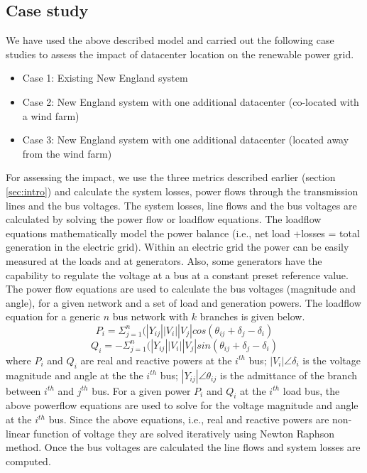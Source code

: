 \subsection{Case study}
\label{sec:casestudy}
We have used the above described model and carried out the following case studies to assess the impact of datacenter location on the renewable power grid.
\begin{itemize}
\item{Case 1: Existing New England system}
\item{Case 2: New England system with one additional datacenter (co-located with a wind farm)}
\item{Case 3: New England system with one additional datacenter (located away from the wind farm)}
\end{itemize}
 For assessing the impact, we use the three metrics described earlier (section \ref{sec:intro}) and calculate the system losses, power flows through the transmission lines and the bus voltages.
The system losses, line flows and the bus voltages are calculated by solving the power flow or loadflow equations. The loadflow equations mathematically model the power balance (i.e., net load +losses = total generation in the electric grid). Within an electric grid the power can be easily measured at the loads and at generators. Also, some generators have the capability to regulate the voltage at a bus at a constant preset reference value. The power flow equations are used to calculate the bus voltages (magnitude and angle), for a given network and a set of load and generation powers. The loadflow equation for a generic $n$ bus network with $k$ branches is given below.
\begin{equation}
P_{i} = \Sigma_{j=1}^{n}(|Y_{ij}||V_{i}||V_{j}|cos(\theta_{ij}+\delta_{j}-\delta_{i})
\end{equation}
\begin{equation}
Q_{i} = -\Sigma_{j=1}^{n}(|Y_{ij}||V_{i}||V_{j}|sin(\theta_{ij}+\delta_{j}-\delta_{i})
\end{equation}
where $P_{i}$ and $Q_{i}$ are real and reactive powers at the $i^{th}$ bus; $|V_{i}| \angle \delta_{i}$ is the voltage magnitude and angle at the the $i^{th}$ bus; $|Y_{ij}| \angle \theta_{ij}$ is the admittance of the branch between $i^{th}$ and $j^{th}$ bus.
For a given power $P_{i}$ and $Q_{i}$ at the $i^{th}$ load bus, the above powerflow equations are used to solve for the voltage magnitude and angle at the $i^{th}$ bus. Since the above equations, i.e., real and reactive powers are non-linear function of voltage they are solved iteratively using Newton Raphson method. Once the bus voltages are calculated the line flows and system losses are computed.
